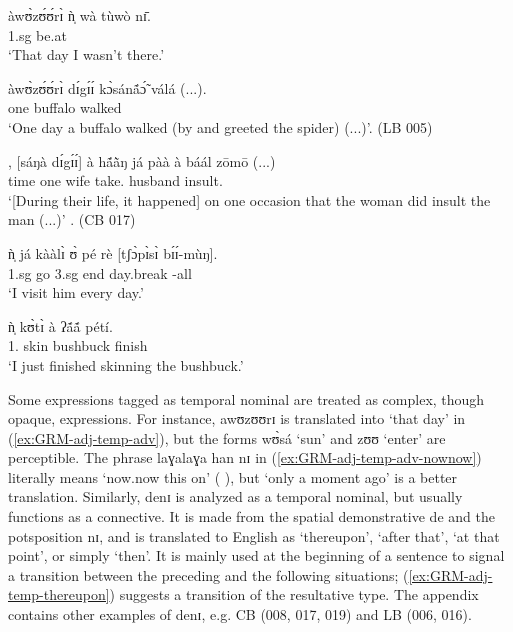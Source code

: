 \begin{exe}
\begin{exe}
\begin{exe}
\ea\label{ex:GRM-adj-temp-adv}

\ea\label{ex:GRM-adj-temp-adv-thatday}

\gll àwʊ̀zʊ́ʊ́rɪ̀ ǹ̩ wà tùwò nɪ̄.\\
{\advt} {\sc 1.sg} {\neg} {be.at} {\postp}\\
\glt `That day I wasn't there.'


\ex\label{ex:GRM-adj-temp-adv-LB5}

\gll àwʊ̀zʊ́ʊ́rɪ̀  dɪ́gɪ́ɪ́     kɔ̀sánã́ɔ̃́   válá (...).\\
{\advt}  one     buffalo walked {}\\
\glt `One day a buffalo walked (by and greeted the spider) (...)'. (LB 005)

\ex\label{ex:GRM-adj-temp-adv-CB17}
\gll [dénɪ̀],   [sáŋà   dɪ́gɪ́ɪ́]   à   
hã́ã̀ŋ já   pàà à  báál   zōmō  (...)\\
{\advt} time   one     {\art}  wife  {\hab}   take.{\pl} 
{\art} husband insult.{\pl} {} \\
\glt `[During their life, it happened] on one occasion that the woman
did insult  the man (...)' .  (CB 017)

\ex\label{ex:GRM-adj-temp-adv-everyday}
\gll  ǹ̩ já kààlɪ̀ ʊ̀ pé rè [{tʃɔ̀pɪ̀sɪ̀} bɪ́ɪ́-mùŋ].\\
 {\sc 1.sg} {\hab} go {\sc 3.sg} end {\foc} day.break {\itr}-all\\
\glt `I visit him every day.'

\ex\label{ex:GRM-adj-temp-adv-nownow}
\gll [làɣálàɣá háǹ nɪ̄] ǹ̩ kʊ̀tɪ̀ à ʔã́ã́ pétí.\\
{\advt} {\dem} {\postp} {1.\sg} {skin} {\art} bushbuck  finish\\
\glt `I  just finished skinning the bushbuck.'


\z 
 \z


Some expressions tagged as temporal nominal are treated as complex, though
opaque, expressions. For instance,  {\sls awʊzʊʊrɪ} is translated into  `that
day' in (\ref{ex:GRM-adj-temp-adv}), but the forms {\sls wʊ̀sá} `sun' and
{\sls zʊʊ} `enter'  are perceptible. The phrase {\sls laɣalaɣa han nɪ} in
(\ref{ex:GRM-adj-temp-adv-nownow}) literally
means `now.now this on' ({\advt} {\dem} {\postp}), but `only a moment
ago'  is a better translation.  Similarly, {\sls denɪ} is analyzed as a
temporal nominal, but usually functions as a connective. It is made from  the
spatial demonstrative {\sls de} and the potsposition {\sls nɪ}, and is 
translated 
to
English as `thereupon', `after that', `at that point', or simply `then'. It is
mainly used at the beginning of a sentence to signal a transition  between the
preceding  and the following situations;
(\ref{ex:GRM-adj-temp-thereupon}) suggests a transition of the resultative type.
The appendix contains other examples of {\sls denɪ}, e.g.  CB (008, 017, 019)
and 
LB (006, 016).



\end{exe}
\end{exe}
\end{exe}
